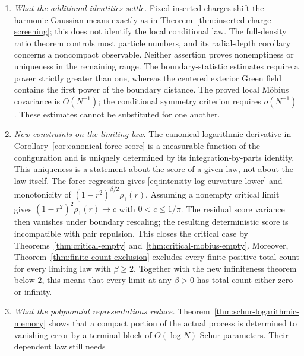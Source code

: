 \documentclass[11pt,a4paper]{article}
\numberwithin{equation}{section}
\theoremstyle{definition}
\theoremstyle{remark}
\begin{document}
\begin{enumerate}
reduces that nonemptiness question to one uniform boundary moment
estimate for a charged characteristic polynomial. By
Corollary~\ref{cor:blaschke-weaker-boundary-exponent}, any boundary
exponent strictly below $2$ suffices; such an estimate is still
an unproved hypothesis. No claim is made that $4$ is the exact threshold
for emptiness. Gaussian mode convergence and intensity lower bounds
do not by themselves identify the interior law.
\item \emph{What the additional identities settle.}
Fixed inserted charges shift the harmonic Gaussian means exactly as in
Theorem~\ref{thm:inserted-charge-screening}; this does not identify the
local conditional law. The full-density ratio theorem controls most
particle numbers, and its radial-depth corollary concerns a noncompact
observable. Neither assertion proves nonemptiness or uniqueness in the
remaining range. The boundary-statistic estimates require a power
strictly greater than one, whereas the centered exterior Green field
contains the first power of the boundary distance.
The proved local M\"obius covariance is $O(N^{-1})$; the conditional
symmetry criterion requires $o(N^{-1})$. These estimates cannot be
substituted for one another.
\item \emph{New constraints on the limiting law.}
The canonical logarithmic derivative in
Corollary~\ref{cor:canonical-force-score} is a measurable function of
the configuration and is uniquely determined by its integration-by-parts
identity. This uniqueness is a statement about the score of a given law,
not about the law itself. The force regression gives
\eqref{eq:intensity-log-curvature-lower} and monotonicity of
$(1-r^2)^{\beta/2}\rho_1(r)$. Assuming a nonempty critical limit gives
$(1-r^2)^2\rho_1(r)\to c$ with $0<c\le1/\pi$. The residual score
variance then vanishes under boundary rescaling; the resulting
deterministic score is incompatible with pair repulsion. This closes
the critical case by Theorems~\ref{thm:critical-empty}
and~\ref{thm:critical-mobius-empty}. Moreover,
Theorem~\ref{thm:finite-count-exclusion} excludes every finite positive
total count for every limiting law with $\beta\ge2$. Together with
the new infiniteness theorem below $2$, this means that every limit
at any $\beta>0$ has total count either zero or infinity.
\item \emph{What the polynomial representations reduce.}
Theorem~\ref{thm:schur-logarithmic-memory} shows that a compact portion
of the actual process is determined to vanishing error by a terminal
block of $O(\log N)$ Schur parameters. Their dependent law still needs

\end{enumerate}
\end{document}
